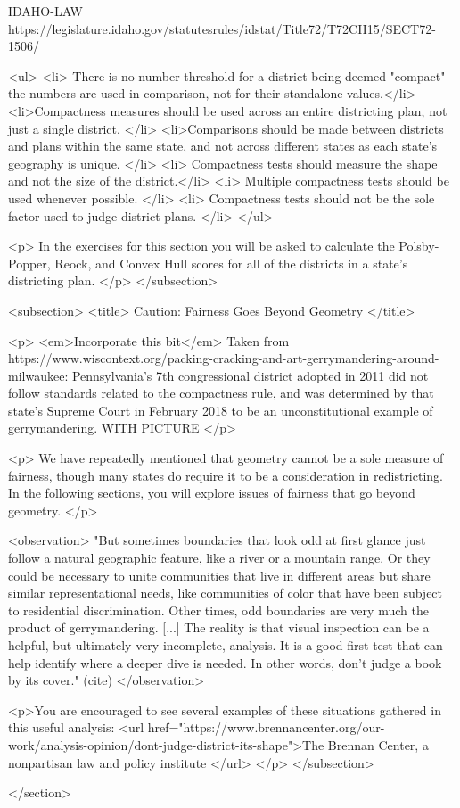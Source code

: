 	IDAHO-LAW 
	https://legislature.idaho.gov/statutesrules/idstat/Title72/T72CH15/SECT72-1506/
	

	<ul>
	<li> There is no number threshold for a district being deemed "compact" - the numbers are used in comparison, not for their standalone values.</li>
	<li>Compactness measures should be used across an entire districting plan, not just a single district. </li>
	<li>Comparisons should be made between districts and plans within the same state, and not across different states as each state's geography is unique. </li>
	<li>  Compactness tests should measure the shape and not the size of the district.</li>
	<li> Multiple compactness tests should be used whenever possible. </li>
	<li> Compactness tests should not be the sole factor used to judge district plans. </li>
	</ul>

	<p> In the exercises for this section you will be asked to calculate the Polsby-Popper, Reock, and Convex Hull scores for all of the districts in a state's districting plan. </p>
	</subsection>


	<subsection> <title> Caution: Fairness Goes Beyond Geometry </title>
	
	
	<p> <em>Incorporate this bit</em> Taken from https://www.wiscontext.org/packing-cracking-and-art-gerrymandering-around-milwaukee: Pennsylvania's 7th congressional district adopted in 2011 did not follow standards related to the compactness rule, and was determined by that state's Supreme Court in February 2018 to be an unconstitutional example of gerrymandering. WITH PICTURE </p>
	
	
	<p> We have repeatedly mentioned that geometry cannot be a sole measure of fairness, though many states do require it to be a consideration in redistricting. In the following sections, you will explore issues of fairness that go beyond geometry. </p>

	<observation> "But sometimes boundaries that look odd at first glance just follow a natural geographic feature, like a river or a mountain range. Or they could be necessary to unite communities that live in different areas but share similar representational needs, like communities of color that have been subject to residential discrimination. Other times, odd boundaries are very much the product of gerrymandering. [...]
The reality is that visual inspection can be a helpful, but ultimately very incomplete, analysis. It is a good first test that can help identify where a deeper dive is needed. In other words, don’t judge a book by its cover." (cite) </observation>

<p>You are encouraged to see several examples of these situations gathered in this useful analysis: <url href="https://www.brennancenter.org/our-work/analysis-opinion/dont-judge-district-its-shape">The Brennan Center, a nonpartisan law and policy institute </url> </p>
	</subsection>


</section>